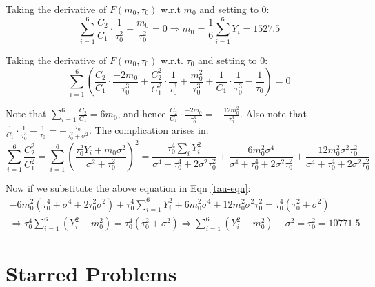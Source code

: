\documentclass{article}
\begin{document}
\begin{flushleft}
Taking the derivative of \(F(m_{0}, \tau_{0})\) w.r.t \(m_{0}\) and setting to \(0\):
\begin{equation}
\sum_{i=1}^{6} \frac{C_{2}}{C_{1}}\cdot\frac{1}{\tau_{0}^{2}} - \frac{m_{0}}{\tau_{0}^{2}} = 0 \Rightarrow m_{0} = \frac{1}{6}\sum_{i=1}^{6}Y_{i} = \boxed{1527.5}
\end{equation}

Taking the derivative of \(F(m_{0}, \tau_{0})\) w.r.t. \(\tau_{0}\) and setting to \(0\):
\begin{equation}
\label{tau-eqn}
\sum_{i=1}^{6} \left(\frac{C_{2}}{C_{1}}\cdot\frac{-2m_{0}}{\tau_{0}^{3}} + \frac{C_{2}^{2}}{C_{1}^{2}}\cdot\frac{1}{\tau_{0}^{3}} + \frac{m_{0}^{2}}{\tau_{0}^{3}} + \frac{1}{C_{1}}\cdot\frac{1}{\tau_{0}^{3}} - \frac{1}{\tau_{0}}\right) = 0
\end{equation}

Note that \(\sum_{i=1}^{6}\frac{C_{2}}{C_{1}} = 6m_{0}\), and hence \(\frac{C_{2}}{C_{1}}\cdot\frac{-2m_{0}}{\tau_{0}^{3}} = -\frac{12m_{0}^{2}}{\tau_{0}^{3}}\). Also note that \(\frac{1}{C_{1}}\cdot\frac{1}{\tau_{0}^{3}} - \frac{1}{\tau_{0}} = -\frac{\tau_{0}}{\tau_{0}^{2} + \sigma^{2}}\). The complication arises in:
\begin{equation}
\sum_{i=1}^{6}\frac{C_{2}^{2}}{C_{1}^{2}} = \sum_{i=1}^{6}\left(\frac{\tau_{0}^{2}Y_{i} + m_{0}\sigma^{2}}{\sigma^{2} + \tau_{0}^{2}}\right)^{2} = \frac{\tau_{0}^{4}\sum_{i} Y_{i}^{2}}{\sigma^{4} + \tau_{0}^{4} + 2\sigma^{2}\tau_{0}^{2}} + \frac{6m_{0}^{2}\sigma^{4}}{\sigma^{4} + \tau_{0}^{4} + 2\sigma^{2}\tau_{0}^{2}} + \frac{12m_{0}^{2}\sigma^{2}\tau_{0}^{2}}{\sigma^{4} + \tau_{0}^{4} + 2\sigma^{2}\tau_{0}^{2}}
\end{equation}

Now if we substitute the above equation in Eqn \ref{tau-eqn}:
\begin{multline}
-6m_{0}^{2}(\tau_{0}^4 + \sigma^{4} + 2\tau_{0}^{2}\sigma^{2}) + \tau_{0}^{4}\sum_{i=1}^{6} Y_{i}^{2} + 6m_{0}^{2}\sigma^{4} + 12m_{0}^{2}\sigma^{2}\tau_{0}^{2} = \tau_{0}^{4} (\tau_{0}^{2} + \sigma^{2}) \\
\Rightarrow \tau_{0}^{4}\sum_{i=1}^{6}(Y_{i}^{2} - m_{0}^{2}) = \tau_{0}^{4}(\tau_{0}^{2} + \sigma^{2}) \Rightarrow \sum_{i=1}^{6}(Y_{i}^{2} - m_{0}^{2}) - \sigma^{2} = \tau_{0}^{2} = \boxed{10771.5}
\end{multline}
\end{flushleft}

\section*{Starred Problems}
\end{document}
